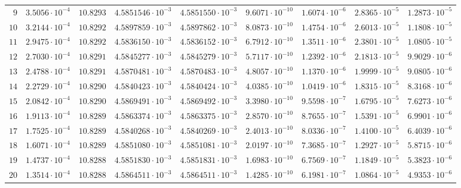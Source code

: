 {\begin{longtable}{@{}rrrrrrrrr@{}}
$9$ & $3.5056\cdot10^{-4}$ & $10.8293$ & $4.5851546\cdot10^{-3}$ & $4.5851550\cdot10^{-3}$ & $9.6071\cdot10^{-10}$ & $1.6074\cdot10^{-6}$ & $2.8365\cdot10^{-5}$ & $1.2873\cdot10^{-5}$\\
$10$ & $3.2144\cdot10^{-4}$ & $10.8292$ & $4.5897859\cdot10^{-3}$ & $4.5897862\cdot10^{-3}$ & $8.0873\cdot10^{-10}$ & $1.4754\cdot10^{-6}$ & $2.6013\cdot10^{-5}$ & $1.1808\cdot10^{-5}$\\
$11$ & $2.9475\cdot10^{-4}$ & $10.8292$ & $4.5836150\cdot10^{-3}$ & $4.5836152\cdot10^{-3}$ & $6.7912\cdot10^{-10}$ & $1.3511\cdot10^{-6}$ & $2.3801\cdot10^{-5}$ & $1.0805\cdot10^{-5}$\\
$12$ & $2.7030\cdot10^{-4}$ & $10.8291$ & $4.5845277\cdot10^{-3}$ & $4.5845279\cdot10^{-3}$ & $5.7117\cdot10^{-10}$ & $1.2392\cdot10^{-6}$ & $2.1813\cdot10^{-5}$ & $9.9029\cdot10^{-6}$\\
$13$ & $2.4788\cdot10^{-4}$ & $10.8291$ & $4.5870481\cdot10^{-3}$ & $4.5870483\cdot10^{-3}$ & $4.8057\cdot10^{-10}$ & $1.1370\cdot10^{-6}$ & $1.9999\cdot10^{-5}$ & $9.0805\cdot10^{-6}$\\
$14$ & $2.2729\cdot10^{-4}$ & $10.8290$ & $4.5840423\cdot10^{-3}$ & $4.5840424\cdot10^{-3}$ & $4.0385\cdot10^{-10}$ & $1.0419\cdot10^{-6}$ & $1.8315\cdot10^{-5}$ & $8.3168\cdot10^{-6}$\\
$15$ & $2.0842\cdot10^{-4}$ & $10.8290$ & $4.5869491\cdot10^{-3}$ & $4.5869492\cdot10^{-3}$ & $3.3980\cdot10^{-10}$ & $9.5598\cdot10^{-7}$ & $1.6795\cdot10^{-5}$ & $7.6273\cdot10^{-6}$\\
$16$ & $1.9113\cdot10^{-4}$ & $10.8289$ & $4.5863374\cdot10^{-3}$ & $4.5863375\cdot10^{-3}$ & $2.8570\cdot10^{-10}$ & $8.7655\cdot10^{-7}$ & $1.5391\cdot10^{-5}$ & $6.9901\cdot10^{-6}$\\
$17$ & $1.7525\cdot10^{-4}$ & $10.8289$ & $4.5840268\cdot10^{-3}$ & $4.5840269\cdot10^{-3}$ & $2.4013\cdot10^{-10}$ & $8.0336\cdot10^{-7}$ & $1.4100\cdot10^{-5}$ & $6.4039\cdot10^{-6}$\\
$18$ & $1.6071\cdot10^{-4}$ & $10.8289$ & $4.5851080\cdot10^{-3}$ & $4.5851081\cdot10^{-3}$ & $2.0197\cdot10^{-10}$ & $7.3685\cdot10^{-7}$ & $1.2927\cdot10^{-5}$ & $5.8715\cdot10^{-6}$\\
$19$ & $1.4737\cdot10^{-4}$ & $10.8288$ & $4.5851830\cdot10^{-3}$ & $4.5851831\cdot10^{-3}$ & $1.6983\cdot10^{-10}$ & $6.7569\cdot10^{-7}$ & $1.1849\cdot10^{-5}$ & $5.3823\cdot10^{-6}$\\
$20$ & $1.3514\cdot10^{-4}$ & $10.8288$ & $4.5864511\cdot10^{-3}$ & $4.5864511\cdot10^{-3}$ & $1.4285\cdot10^{-10}$ & $6.1981\cdot10^{-7}$ & $1.0864\cdot10^{-5}$ & $4.9353\cdot10^{-6}$\\

\end{longtable}}
